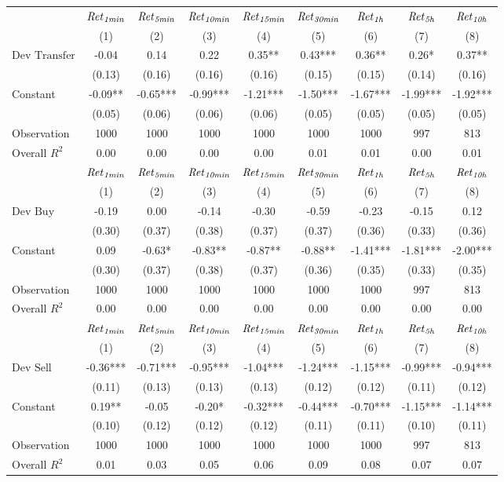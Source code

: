 \begin{tabular}{lcccccccc}
\hline
 & ${\it Ret}_{\it 1min}$ & ${\it Ret}_{\it 5min}$ & ${\it Ret}_{\it 10min}$ & ${\it Ret}_{\it 15min}$ & ${\it Ret}_{\it 30min}$ & ${\it Ret}_{\it 1h}$ & ${\it Ret}_{\it 5h}$ & ${\it Ret}_{\it 10h}$ \\
 & (1) & (2) & (3) & (4) & (5) & (6) & (7) & (8) \\
\hline
$\text{Dev Transfer}$ & -0.04 & 0.14 & 0.22 & 0.35** & 0.43*** & 0.36** & 0.26* & 0.37** \\
 & (0.13) & (0.16) & (0.16) & (0.16) & (0.15) & (0.15) & (0.14) & (0.16) \\
Constant & -0.09** & -0.65*** & -0.99*** & -1.21*** & -1.50*** & -1.67*** & -1.99*** & -1.92*** \\
 & (0.05) & (0.06) & (0.06) & (0.06) & (0.05) & (0.05) & (0.05) & (0.05) \\
Observation & 1000 & 1000 & 1000 & 1000 & 1000 & 1000 & 997 & 813 \\
Overall $R^2$ & 0.00 & 0.00 & 0.00 & 0.00 & 0.01 & 0.01 & 0.00 & 0.01 \\
\hline
 & ${\it Ret}_{\it 1min}$ & ${\it Ret}_{\it 5min}$ & ${\it Ret}_{\it 10min}$ & ${\it Ret}_{\it 15min}$ & ${\it Ret}_{\it 30min}$ & ${\it Ret}_{\it 1h}$ & ${\it Ret}_{\it 5h}$ & ${\it Ret}_{\it 10h}$ \\
 & (1) & (2) & (3) & (4) & (5) & (6) & (7) & (8) \\
\hline
$\text{Dev Buy}$ & -0.19 & 0.00 & -0.14 & -0.30 & -0.59 & -0.23 & -0.15 & 0.12 \\
 & (0.30) & (0.37) & (0.38) & (0.37) & (0.37) & (0.36) & (0.33) & (0.36) \\
Constant & 0.09 & -0.63* & -0.83** & -0.87** & -0.88** & -1.41*** & -1.81*** & -2.00*** \\
 & (0.30) & (0.37) & (0.38) & (0.37) & (0.36) & (0.35) & (0.33) & (0.35) \\
Observation & 1000 & 1000 & 1000 & 1000 & 1000 & 1000 & 997 & 813 \\
Overall $R^2$ & 0.00 & 0.00 & 0.00 & 0.00 & 0.00 & 0.00 & 0.00 & 0.00 \\
\hline
 & ${\it Ret}_{\it 1min}$ & ${\it Ret}_{\it 5min}$ & ${\it Ret}_{\it 10min}$ & ${\it Ret}_{\it 15min}$ & ${\it Ret}_{\it 30min}$ & ${\it Ret}_{\it 1h}$ & ${\it Ret}_{\it 5h}$ & ${\it Ret}_{\it 10h}$ \\
 & (1) & (2) & (3) & (4) & (5) & (6) & (7) & (8) \\
\hline
$\text{Dev Sell}$ & -0.36*** & -0.71*** & -0.95*** & -1.04*** & -1.24*** & -1.15*** & -0.99*** & -0.94*** \\
 & (0.11) & (0.13) & (0.13) & (0.13) & (0.12) & (0.12) & (0.11) & (0.12) \\
Constant & 0.19** & -0.05 & -0.20* & -0.32*** & -0.44*** & -0.70*** & -1.15*** & -1.14*** \\
 & (0.10) & (0.12) & (0.12) & (0.12) & (0.11) & (0.11) & (0.10) & (0.11) \\
Observation & 1000 & 1000 & 1000 & 1000 & 1000 & 1000 & 997 & 813 \\
Overall $R^2$ & 0.01 & 0.03 & 0.05 & 0.06 & 0.09 & 0.08 & 0.07 & 0.07 \\
\hline
\end{tabular}
